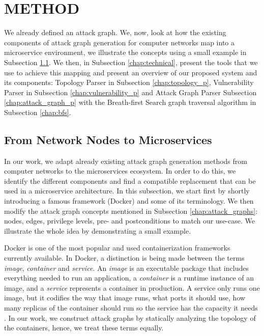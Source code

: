 \section{METHOD}
\label{chap:method}
We already defined an attack graph. We, now, look at how the existing components of attack graph generation for computer networks map into a microservice environment, we illustrate the concepts using a small example in Subsection \ref{chap:mapping}. We then, in Subsection \ref{chap:technical}, present the tools that we use to achieve this mapping and present an overview of our proposed system and its components: Topology Parser in Subsection \ref{chap:topology_p}, Vulnerability Parser in Subsection \ref{chap:vulnerability_p} and Attack Graph Parser Subsection \ref{chap:attack_graph_p} with the Breath-first Search graph traversal algorithm in Subsection \ref{chap:bfs}. 


\subsection{From Network Nodes to Microservices}
\label{chap:mapping}
In our work, we adapt already existing attack graph generation methods from computer networks to the microservices ecosystem. In order to do this, we identify the different components and find a compatible replacement that can be used in a microservice architecture. In this subsection, we start first by shortly introducing a famous framework (Docker) and some of its terminology. We then modify the attack graph concepts mentioned in Subsection \ref{chap:attack_graphs}: nodes, edges, privilege levels, pre- and postconditions to match our use-case. We illustrate the whole idea  by demonstrating a small example.

Docker is one of the most popular and used containerization frameworks currently available. In Docker, a distinction is being made between the terms \textit{image}, \textit{container} and \textit{service}. An \textit{image} is an executable package that includes everything needed to run an application, a \textit{container} is a runtime instance of an image, and a \textit{service} represents a container in production. A service only runs one image, but it codifies the way that image runs, what ports it should use, how many replicas of the container should run so the service has the capacity it needs \cite{merkel2014docker}. In our work, we construct attack graphs by statically analyzing the topology of the containers, hence, we treat these terms equally.  

